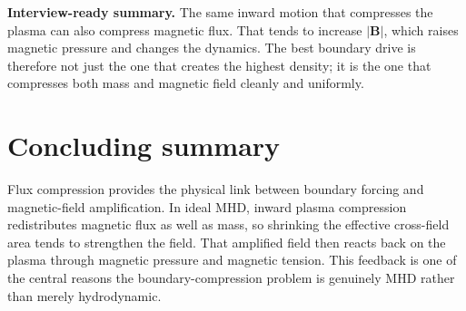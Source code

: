 \documentclass[11pt]{article}
\begin{document}
\begin{keybox}
\textbf{Interview-ready summary.} The same inward motion that compresses the plasma can also compress magnetic flux. That tends to increase $|\mathbf{B}|$, which raises magnetic pressure and changes the dynamics. The best boundary drive is therefore not just the one that creates the highest density; it is the one that compresses both mass and magnetic field cleanly and uniformly.
\end{keybox}

\section{Concluding summary}
Flux compression provides the physical link between boundary forcing and magnetic-field amplification. In ideal MHD, inward plasma compression redistributes magnetic flux as well as mass, so shrinking the effective cross-field area tends to strengthen the field. That amplified field then reacts back on the plasma through magnetic pressure and magnetic tension. This feedback is one of the central reasons the boundary-compression problem is genuinely MHD rather than merely hydrodynamic.
\end{document}
